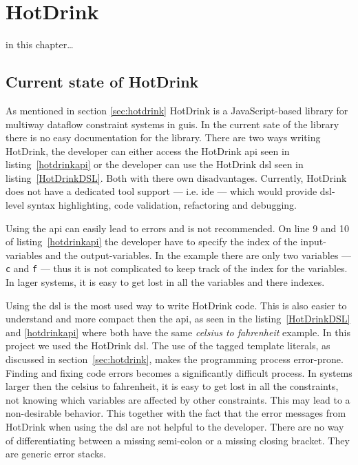 \chapter{HotDrink} 
in this chapter…

\section{Current state of HotDrink}
\label{sec:currentstate}

As mentioned in section \ref{sec:hotdrink} HotDrink is a JavaScript-based library for
multiway dataflow constraint systems in \gls{gui}s. In the current sate of the library 
there is no easy documentation for the library. There are two ways writing HotDrink, 
the developer can either access the HotDrink \gls{api} seen in listing~\ref{hotdrinkapi} 
or the developer can use the HotDrink \gls{dsl} seen in listing~\ref{HotDrinkDSL}. Both 
with there own disadvantages. Currently, HotDrink does not have a dedicated tool 
support --- i.e. \gls{ide} --- which would provide \gls{dsl}-level syntax highlighting, 
code validation, refactoring and debugging.

Using the \gls{api} can easily lead to errors and is not recommended. On line 9 and 10 
of listing~\ref{hotdrinkapi} the developer have to specify the index of the 
input-variables and the output-variables. In the example there are only two variables 
--- \texttt{c} and \texttt{f} --- thus it is not complicated to keep track of the index 
for the variables. In lager systems, it is easy to get lost in all the variables and 
there indexes.

Using the \gls{dsl} is the most used way to write HotDrink code. This is also easier to 
understand and more compact then the \gls{api}, as seen in the listing~\ref{HotDrinkDSL} 
and \ref{hotdrinkapi} where both have the same \textit{celsius to fahrenheit} example. In 
this project we used the HotDrink \gls{dsl}. The use of the tagged template literals, as 
discussed in section~\ref{sec:hotdrink}, makes the programming process error-prone. 
Finding and fixing code errors becomes a significantly difficult process. In systems 
larger then the celsius to fahrenheit, it is easy to get lost in all the constraints, 
not knowing which variables are affected by other constraints. This may lead to a 
non-desirable behavior.
This together with the fact that the error messages from HotDrink when using 
the \gls{dsl} are not helpful to the developer. There are no way of differentiating 
between a missing semi-colon or a missing closing bracket. They are generic error 
stacks. 

